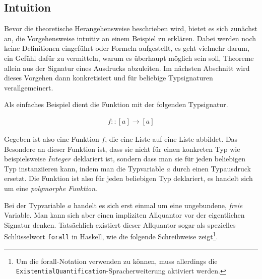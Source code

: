 \subsection{Intuition}

Bevor die theoretische Herangehensweise beschrieben wird, bietet es sich zunächst an, die Vorgehensweise intuitiv an einem
Beispiel zu erklären. Dabei werden noch keine Definitionen eingeführt oder Formeln aufgestellt, es geht vielmehr darum,
ein Gefühl dafür zu vermitteln, warum es überhaupt möglich sein soll, Theoreme allein aus der Signatur eines Ausdrucks
abzuleiten. Im nächsten Abschnitt wird dieses Vorgehen dann konkretisiert und für beliebige Typsignaturen verallgemeinert.

Als einfaches Beispiel dient die Funktion mit der folgenden Typsignatur.


\begin{align}
f :: [a] \rightarrow [a] \label{eq:fsig}
\end{align}

Gegeben ist also eine Funktion $f$, die eine Liste auf eine Liste abbildet. Das Besondere an dieser Funktion ist, dass sie
nicht für einen konkreten Typ wie beispielsweise $Integer$ deklariert ist, sondern dass man sie für jeden
beliebigen Typ instanziieren kann, indem man die Typvariable $a$ durch einen Typausdruck ersetzt. Die Funktion ist also für
jeden beliebigen Typ deklariert, es handelt sich um eine \textit{polymorphe Funktion}.

Bei der Typvariable $a$ handelt es sich erst einmal um eine ungebundene, \textit{freie} Variable. Man kann sich aber einen impliziten
Allquantor vor der eigentlichen Signatur denken. Tatsächlich existiert dieser Allquantor sogar als spezielles Schlüsselwort \texttt{forall} in Haskell,
wie die folgende Schreibweise zeigt\footnote{Um die forall-Notation verwenden zu können, muss allerdings die \texttt{ExistentialQuantification}-Spracherweiterung aktiviert werden.}.

